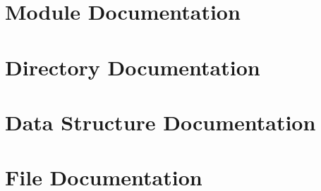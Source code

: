 \documentclass[a4paper]{book}
\begin{document}
\chapter{Module Documentation}




















\chapter{Directory Documentation}










\chapter{Data Structure Documentation}















\chapter{File Documentation}






\printindex
\end{document}
